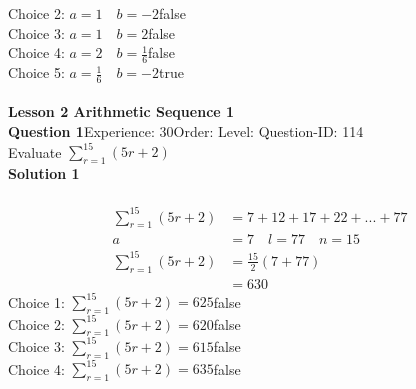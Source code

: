 \documentclass{article}
\begin{document}
Choice 2: \hspace{20pt}$a=1 \quad b=-2$\hspace{20pt}false\\
Choice 3: \hspace{20pt}$a=1 \quad b=2$\hspace{20pt}false\\
Choice 4: \hspace{20pt}$a=2 \quad b=\displaystyle\frac{1}{6}$\hspace{20pt}false\\
Choice 5: \hspace{20pt}$a=\displaystyle\frac{1}{6} \quad b=-2$\hspace{20pt}true\\
\\[4pt]
\noindent\large{\textbf{Lesson 2 Arithmetic Sequence 1}}\\[12pt]
\noindent\textbf{Question 1}\hspace{20pt}Experience: 30\hspace{20pt}Order: \hspace{20pt}Level: \hspace{20pt}Question-ID: 114\\[2pt]
Evaluate $\displaystyle\sum_{r=1}^{15} (5r+2)$\\[4pt]
\noindent\textbf{Solution 1}\\[2pt]
\\[-35pt]\begin{align*}
\displaystyle\sum_{r=1}^{15} (5r+2)&=7+12+17+22+...+77\\[2pt]
a&=7\quad l=77 \quad n=15\\[2pt]
\displaystyle\sum_{r=1}^{15} (5r+2)&=\displaystyle\frac{15}{2}(7+77)\\[2pt]
&=630
\end{align*}
Choice 1: \hspace{20pt}$\displaystyle\sum_{r=1}^{15} (5r+2)=625$\hspace{20pt}false\\
Choice 2: \hspace{20pt}$\displaystyle\sum_{r=1}^{15} (5r+2)=620$\hspace{20pt}false\\
Choice 3: \hspace{20pt}$\displaystyle\sum_{r=1}^{15} (5r+2)=615$\hspace{20pt}false\\
Choice 4: \hspace{20pt}$\displaystyle\sum_{r=1}^{15} (5r+2)=635$\hspace{20pt}false\\
\end{document}
